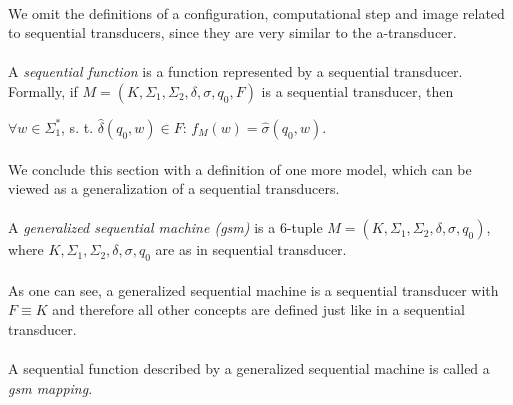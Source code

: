 \paragraph{}
We omit the definitions of a configuration, computational step and image related to sequential transducers, since they are very similar to the a-transducer.

\paragraph{}
 A \emph{sequential function} is a function represented by a sequential transducer. Formally, if $M=(K, \Sigma_{1}, \Sigma_{2}, \delta, \sigma, q_{0}, F)$ is a sequential transducer, then \\
\centerline{$\forall w \in \Sigma_{1}^{*}$, s. t. $\hat{\delta}(q_{0}, w) \in F$: $f_{M}(w) = \hat{\sigma}(q_{0}, w)$.}

\paragraph{}
We conclude this section with a definition of one more model, which can be viewed as a generalization of a sequential transducers.

\paragraph{}
 A \emph{generalized sequential machine (gsm)} is a 6-tuple $M=(K, \Sigma_{1}, \Sigma_{2}, \delta, \sigma, q_{0})$, where $K, \Sigma_{1}, \Sigma_{2}, \delta, \sigma, q_{0}$ are as in sequential transducer.

\paragraph{}
As one can see, a generalized sequential machine is a sequential transducer with $F \equiv K$ and therefore all other concepts are defined just like in a sequential transducer.

\paragraph{}
\oznacenie A sequential function described by a generalized sequential machine is called a \emph{gsm mapping}.

\paragraph{}
